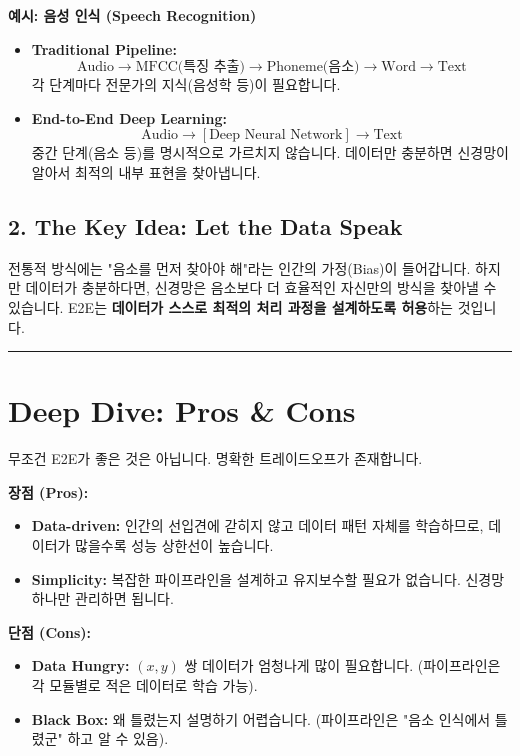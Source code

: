 \documentclass[11pt,a4paper]{book}
\theoremstyle{definition}
\begin{document}
\textbf{예시: 음성 인식 (Speech Recognition)}
\begin{itemize}
    \item \textbf{Traditional Pipeline:}
    $$ \text{Audio} \to \text{MFCC(특징 추출)} \to \text{Phoneme(음소)} \to \text{Word} \to \text{Text} $$
    각 단계마다 전문가의 지식(음성학 등)이 필요합니다.
    
    \item \textbf{End-to-End Deep Learning:}
    $$ \text{Audio} \to [\text{Deep Neural Network}] \to \text{Text} $$
    중간 단계(음소 등)를 명시적으로 가르치지 않습니다. 데이터만 충분하면 신경망이 알아서 최적의 내부 표현을 찾아냅니다.
\end{itemize}

\subsection{2. The Key Idea: Let the Data Speak}
전통적 방식에는 "음소를 먼저 찾아야 해"라는 인간의 가정(Bias)이 들어갑니다. 하지만 데이터가 충분하다면, 신경망은 음소보다 더 효율적인 자신만의 방식을 찾아낼 수 있습니다. E2E는 \textbf{데이터가 스스로 최적의 처리 과정을 설계하도록 허용}하는 것입니다.

\vspace{0.5cm}\hrule\vspace{0.5cm}

\section{Deep Dive: Pros \& Cons}

무조건 E2E가 좋은 것은 아닙니다. 명확한 트레이드오프가 존재합니다.

\begin{strategybox}[title={End-to-End 장단점 분석}]
\textbf{장점 (Pros):}
\begin{itemize}
    \item \textbf{Data-driven:} 인간의 선입견에 갇히지 않고 데이터 패턴 자체를 학습하므로, 데이터가 많을수록 성능 상한선이 높습니다.
    \item \textbf{Simplicity:} 복잡한 파이프라인을 설계하고 유지보수할 필요가 없습니다. 신경망 하나만 관리하면 됩니다.
\end{itemize}

\textbf{단점 (Cons):}
\begin{itemize}
    \item \textbf{Data Hungry:} $(x, y)$ 쌍 데이터가 엄청나게 많이 필요합니다. (파이프라인은 각 모듈별로 적은 데이터로 학습 가능).
    \item \textbf{Black Box:} 왜 틀렸는지 설명하기 어렵습니다. (파이프라인은 "음소 인식에서 틀렸군" 하고 알 수 있음).
\end{itemize}
\end{strategybox}
\end{document}
